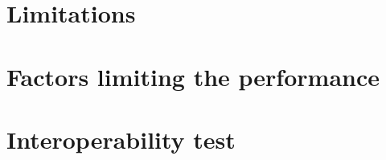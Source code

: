 \documentclass[11pt,a4paper]{article}
\begin{document}
\section{Limitations}

\section{Factors limiting the performance}

\section{Interoperability test }

    
\end{document}
